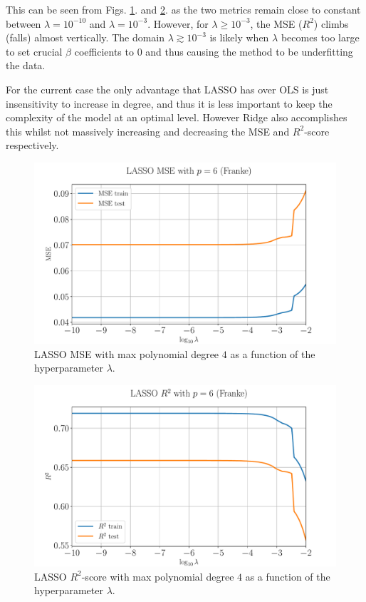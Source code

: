 \documentclass[%
reprint,
amsmath,amssymb,
aps,
pra,
]{revtex4-2}
\begin{document}
This can be seen from Figs. \ref{fig:LASSO_logMSE_degree}. and \ref{fig:LASSO_logR2_degree}. as the two metrics remain close to constant between $\lambda=10^{-10}$ and $\lambda=10^{-3}$. However, for \(\lambda\geq 10^{-3}\), the MSE (\(R^2\)) climbs (falls) almost vertically. The domain \(\lambda\gtrsim 10^{-3}\) is likely when $\lambda$ becomes too large to set crucial $\beta$ coefficients to $0$ and thus causing the method to be underfitting the data.

For the current case the only advantage that LASSO has over OLS is just insensitivity to increase in degree, and thus it is less important to keep the complexity of the model at an optimal level. However Ridge also accomplishes this whilst not massively increasing and decreasing the MSE and $R^2$-score respectively.
\begin{figure}[ht!]
	\centering
	\includegraphics[width=\linewidth]{Python/Figures/LASSO/LASSO_logMSE_Unscaled.pdf}
	\caption{LASSO MSE with max polynomial degree $4$ as a function of the hyperparameter $\lambda$.}
	\label{fig:LASSO_logMSE_degree}
\end{figure}

\begin{figure}[ht!]
	\centering
	\includegraphics[width=\linewidth]{Python/Figures/LASSO/LASSO_logR2_Unscaled.pdf}
	\caption{LASSO $R^2$-score with max polynomial degree $4$ as a function of the hyperparameter $\lambda$.}
	\label{fig:LASSO_logR2_degree}
\end{figure}
\end{document}
